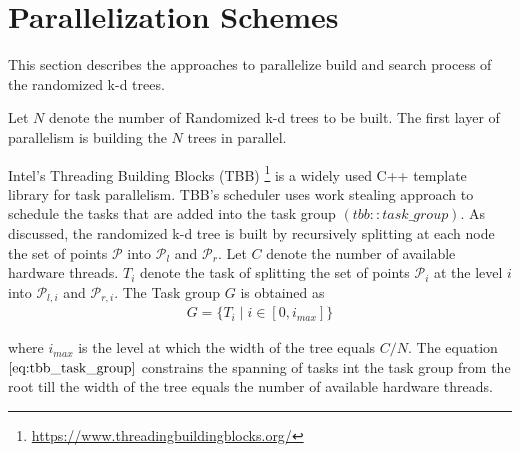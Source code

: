 \section{Parallelization Schemes}
  \label{sec:parallelisation_schemes}

This section describes the approaches to parallelize build and search process
 of the randomized k-d trees. 

Let $N$ denote the number of Randomized k-d trees to be built. The first
 layer of parallelism is building the $N$ trees in parallel.

Intel's Threading Building Blocks (TBB) \footnote{\url{https://www.threadingbuildingblocks.org/}} is a widely used C++ template library for
 task parallelism. TBB's scheduler uses work stealing approach to schedule the
  tasks that are added into the task group $(tbb::task\_group)$. As
   discussed, the randomized k-d tree is built by recursively splitting at each
    node the set of points $\mathcal{P}$ into $\mathcal{P}_{l}$ and $\mathcal{P}_{r}$. Let $C$ denote the number of available hardware 
    threads. $T_i$ denote the task of splitting the set of points $\mathcal{P}_{i}$ at the level $i$ into $\mathcal{P}_{l,i}$ and $\mathcal{P}_{r,i}$. The
     Task group $G$ is obtained as
\begin{align}
G=\lbrace T_i \mid i \in [0,i_{max}] \rbrace
\end{align} 
\label{eq:tbb_task_group} 

where $i_{max}$ is the level at which the width of the tree equals $C/N$.
 The equation $\ref{eq:tbb_task_group}$  constrains the spanning of tasks
  int the task group from the root till the width of the tree equals the number of available hardware threads. 
  




